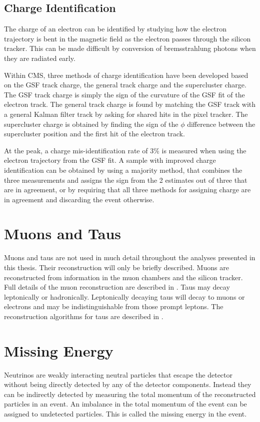 \subsection{Charge Identification}
\label{sec:charge}
The charge of an electron can be identified by studying how the electron
trajectory is bent in the magnetic field as the electron passes through the
silicon tracker. This can be made difficult by conversion of bremsstrahlung
photons when they are radiated early.

Within CMS, three methods of charge identification have been developed based on
the \ac{GSF} track charge, the general track charge and the supercluster charge. The
\ac{GSF} track charge is simply the sign of the curvature of the \ac{GSF} fit of the
electron track. The general track charge is found by matching the \ac{GSF} track with
a general Kalman filter track by asking for shared hits in the pixel tracker. 
The supercluster charge is obtained by finding the sign of the $\phi$ difference
between the supercluster position and the first hit of the electron track.

At the \PZ peak, a charge mis-identification rate of \unit{3}{\%} \cite{eReco}
is measured when using the electron trajectory from the \ac{GSF} fit.  A sample with
improved charge identification can be obtained by using a majority method, that
combines the three measurements and assigns the sign from the 2 estimates out of
three that are in agreement, or by requiring that all three methods for
assigning charge are in agreement and discarding the event otherwise.

\section{Muons and Taus}
Muons and taus are not used in much detail throughout the analyses presented in
this thesis. Their reconstruction will only be briefly described. 
Muons are reconstructed from information in the muon chambers and the silicon
tracker.  Full details of the muon reconstruction are described in \cite{}.
Taus may decay leptonically or hadronically. Leptonically decaying taus will
decay to muons or electrons and may be indistinguishable from those prompt
leptons. The reconstruction algorithms for taus are described in \cite{}.

\section{Missing Energy} 
Neutrinos are weakly interacting neutral particles that escape the
detector without being directly detected by any of the detector components. 
Instead they can be indirectly detected by measuring the total momentum of the
reconstructed particles in an event.
An imbalance in the total momentum of the event can be assigned to undetected
particles. This is called the missing energy in the event.

